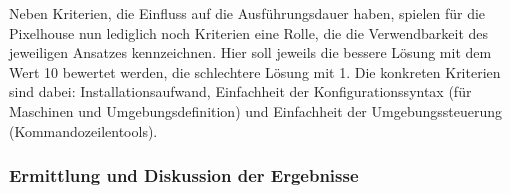 Neben Kriterien, die Einfluss auf die Ausführungsdauer haben, spielen für die Pixelhouse nun lediglich noch Kriterien eine Rolle, die die Verwendbarkeit des jeweiligen Ansatzes kennzeichnen. Hier soll jeweils die bessere Lösung mit dem Wert 10 bewertet werden, die schlechtere Lösung mit 1. Die konkreten Kriterien sind dabei: Installationsaufwand, Einfachheit der Konfigurationssyntax (für Maschinen und Umgebungsdefinition) und Einfachheit der Umgebungssteuerung (Kommandozeilentools).

\subsubsection{Ermittlung und Diskussion der Ergebnisse}
